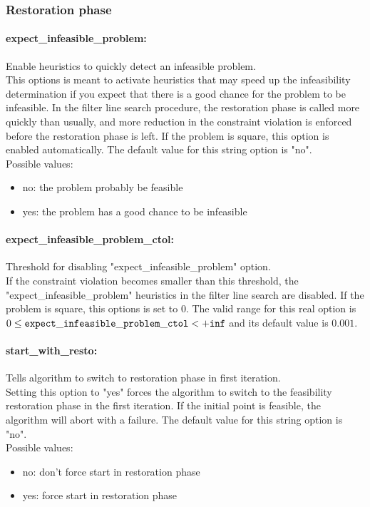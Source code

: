 \subsubsection{Restoration phase}

\paragraph{expect\_infeasible\_problem:} Enable heuristics to quickly detect an infeasible problem. $\;$ \\
 This options is meant to activate heuristics that
may speed up the infeasibility determination if
you expect that there is a good chance for the
problem to be infeasible.  In the filter line
search procedure, the restoration phase is called
more quickly than usually, and more reduction in
the constraint violation is enforced before the
restoration phase is left. If the problem is
square, this option is enabled automatically.
The default value for this string option is "no".
\\ 
Possible values:
\begin{itemize}
   \item no: the problem probably be feasible
   \item yes: the problem has a good chance to be infeasible
\end{itemize}

\paragraph{expect\_infeasible\_problem\_ctol:} Threshold for disabling "expect\_infeasible\_problem" option. $\;$ \\
 If the constraint violation becomes smaller than
this threshold, the "expect\_infeasible\_problem"
heuristics in the filter line search are
disabled. If the problem is square, this options
is set to 0. The valid range for this real option is 
$0 \le {\tt expect\_infeasible\_problem\_ctol } <  {\tt +inf}$
and its default value is $0.001$.


\paragraph{start\_with\_resto:} Tells algorithm to switch to restoration phase in first iteration. $\;$ \\
 Setting this option to "yes" forces the algorithm
to switch to the feasibility restoration phase in
the first iteration. If the initial point is
feasible, the algorithm will abort with a failure.
The default value for this string option is "no".
\\ 
Possible values:
\begin{itemize}
   \item no: don't force start in restoration phase
   \item yes: force start in restoration phase
\end{itemize}

